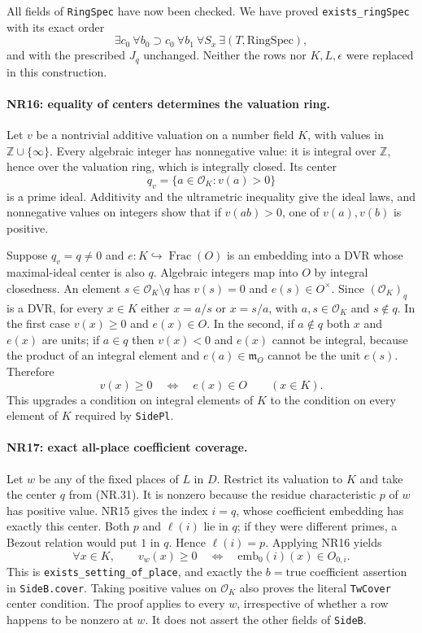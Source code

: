 All fields of \texttt{RingSpec} have now been checked. We have
proved \texttt{exists\_ringSpec} with its exact order
\[
       \exists c_0\ \forall b_0\supset c_0\ \forall b_1\ \forall S_x
                   \ \exists(T,\mathrm{RingSpec}),     \tag{NR.30}
\]
and with the prescribed $J_q$ unchanged. Neither the rows nor
$K,L,\epsilon$ were replaced in this construction.

\paragraph{NR16: equality of centers determines the valuation ring.}
Let $v$ be a nontrivial additive valuation on a number field $K$,
with values in $\mathbb Z\cup\{\infty\}$. Every algebraic integer
has nonnegative value: it is integral over $\mathbb Z$, hence
over the valuation ring, which is integrally closed. Its center
\[
                   q_v=\{a\in\mathcal O_K:v(a)>0\}    \tag{NR.31}
\]
is a prime ideal. Additivity and the ultrametric inequality
give the ideal laws, and nonnegative values on integers show
that if $v(ab)>0$, one of $v(a),v(b)$ is positive.

Suppose $q_v=q\ne0$ and $e:K\hookrightarrow\operatorname{Frac}(O)$
is an embedding into a DVR whose maximal-ideal center is also $q$.
Algebraic integers map into $O$ by integral closedness. An element
$s\in\mathcal O_K\setminus q$ has $v(s)=0$ and $e(s)\in O^\times$.
Since $(\mathcal O_K)_q$ is a DVR, for every $x\in K$ either
$x=a/s$ or $x=s/a$, with $a,s\in\mathcal O_K$ and $s\notin q$.
In the first case $v(x)\ge0$ and $e(x)\in O$. In the second,
if $a\notin q$ both $x$ and $e(x)$ are units; if $a\in q$ then
$v(x)<0$ and $e(x)$ cannot be integral, because the product of
an integral element and $e(a)\in\mathfrak m_O$ cannot be the
unit $e(s)$. Therefore
\[
                 v(x)\ge0\quad\Longleftrightarrow\quad e(x)\in O
                               \qquad(x\in K).         \tag{NR.32}
\]
This upgrades a condition on integral elements of $K$ to the
condition on every element of $K$ required by \texttt{SidePl}.

\paragraph{NR17: exact all-place coefficient coverage.}
Let $w$ be any of the fixed places of $L$ in $D$. Restrict its
valuation to $K$ and take the center $q$ from (NR.31). It is
nonzero because the residue characteristic $p$ of $w$ has positive
value. NR15 gives the index $i=q$, whose coefficient embedding
has exactly this center. Both $p$ and $\ell(i)$ lie in $q$;
if they were different primes, a Bezout relation would put
$1$ in $q$. Hence $\ell(i)=p$. Applying NR16 yields
\[
 \forall x\in K,\qquad
   v_w(x)\ge0\quad\Longleftrightarrow\quad
                 \mathrm{emb}_0(i)(x)\in O_{0,i}.     \tag{NR.33}
\]
This is \texttt{exists\_setting\_of\_place}, and exactly the
$b=\mathrm{true}$ coefficient assertion in \texttt{SideB.cover}.
Taking positive values on $\mathcal O_K$ also proves the literal
\texttt{TwCover} center condition. The proof applies to every
$w$, irrespective of whether a row happens to be nonzero at $w$.
It does not assert the other fields of \texttt{SideB}.

